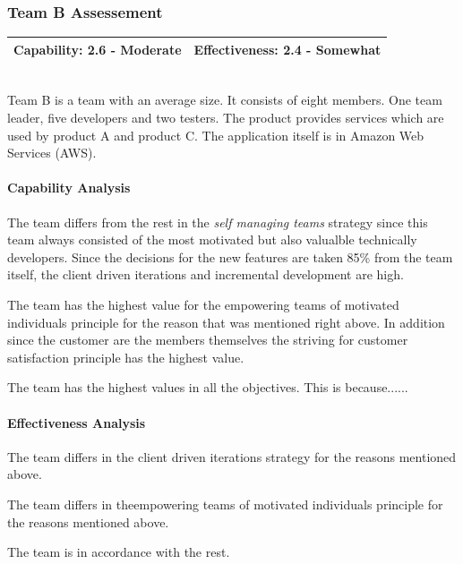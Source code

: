 \subsubsection{Team B Assessement}
\begin{tabular}{| p{6cm} | p{6cm}|}
\hline
\textbf{Capability:} 2.6 - Moderate & \textbf{Effectiveness:} 2.4 - Somewhat \\ \hline
\end{tabular} \\

Team B is a team with an average size. It consists of eight members. One team  leader, five developers and two testers. The product provides services which are used by product A and product C. The application itself is in Amazon Web Services (AWS).

\paragraph{Capability Analysis}

The team differs from the rest in the \textit{self managing teams} strategy since this team always consisted of the most motivated but also valualble technically developers. Since the decisions for the new features are taken 85\% from the team itself, the client driven iterations and incremental development are high.

The team has the highest value for the empowering teams of motivated individuals principle for the reason that was mentioned right above. In addition since the customer are the members themselves the striving for customer satisfaction principle has the highest value.

The team has the highest values in all the objectives. This is because......

\paragraph{Effectiveness Analysis}

The team differs in the client driven iterations strategy for the reasons mentioned above.

The team differs in theempowering teams of motivated individuals principle for the reasons mentioned above.

The team is in accordance with the rest.


